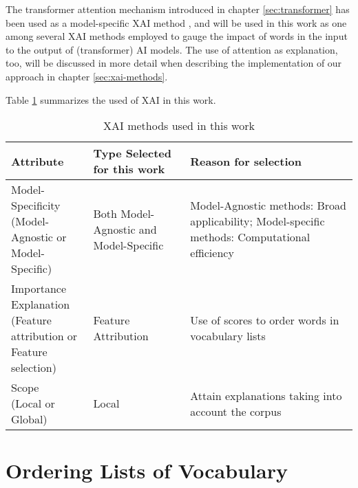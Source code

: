 The transformer attention mechanism introduced in chapter \ref{sec:transformer} has been used as a model-specific XAI method
\cite{liUnderstandingNeuralNetworks2017}
\cite{leiInterpretableNeuralModels2017}
, and will be used in this work as one among several XAI methods employed to gauge the impact of words in the input to the output of (transformer) AI models.
The use of attention as explanation, too, will be discussed in more detail when describing the implementation of our approach in chapter \ref{sec:xai-methods}.

Table \ref{table:XAi-method-criteria} summarizes the used of XAI in this work.

\begin{table}[ht]
	\centering
	\begin{tabularx}{\textwidth}{|X|X|X|}
		\hline
		\textbf{Attribute} & \textbf{Type Selected for this work} & \textbf{Reason for selection} \\
		\hline
		\makecell[l]{Model-Specificity                                                            \\(Model-Agnostic or \\Model-Specific)} & Both Model-Agnostic and Model-Specific & Model-Agnostic methods: Broad applicability; Model-specific methods: Computational efficiency \\
		\hline
		\makecell[l]{Importance Explanation                                                       \\(Feature attribution or \\Feature selection)}                                 & Feature Attribution                 & Use of scores to order words in vocabulary lists                                                                        \\
		\hline
		\makecell[l]{Scope                                                                        \\(Local or Global)}                                                       & Local                                  & Attain explanations taking into account the corpus                                          \\
		\hline
	\end{tabularx}
	\caption{XAI methods used in this work}
	\label{table:XAi-method-criteria}
\end{table}

\section{Ordering Lists of Vocabulary} \label{sec:ordering-lists-of-vocabulary}

